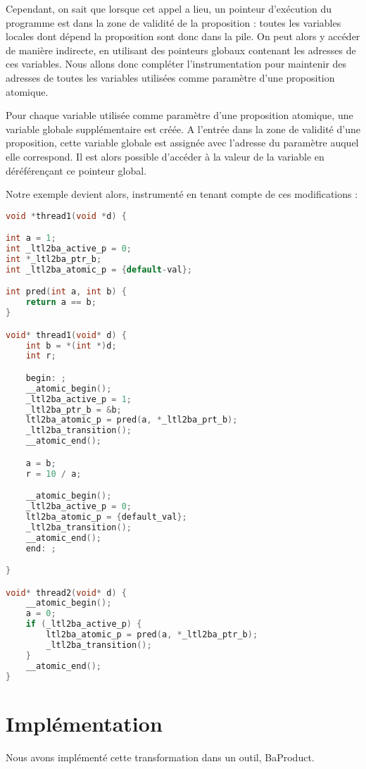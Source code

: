 Cependant, on sait que lorsque cet appel a lieu, un pointeur d'exécution
du programme est dans la zone de validité de la proposition : toutes les
variables locales dont dépend la proposition sont donc dans la pile. On
peut alors y accéder de manière indirecte, en utilisant des pointeurs
globaux contenant les adresses de ces variables. Nous allons donc
compléter l'instrumentation pour maintenir des adresses de toutes les
variables utilisées comme paramètre d'une proposition atomique.

Pour chaque variable utilisée comme paramètre d'une proposition
atomique, une variable globale supplémentaire est créée. A l'entrée dans
la zone de validité d'une proposition, cette variable globale est
assignée avec l'adresse du paramètre auquel elle correspond. Il est
alors possible d'accéder à la valeur de la variable en déréférençant ce
pointeur global.

Notre exemple devient alors, instrumenté en tenant compte de ces
modifications :

\begin{lstlisting}[language=C]
void *thread1(void *d) {

int a = 1;
int _ltl2ba_active_p = 0;
int *_ltl2ba_ptr_b;
int _ltl2ba_atomic_p = {default-val};

int pred(int a, int b) {
    return a == b;
}

void* thread1(void* d) {
    int b = *(int *)d;
    int r;

    begin: ;
    __atomic_begin();
    _ltl2ba_active_p = 1;
    _ltl2ba_ptr_b = &b;
    ltl2ba_atomic_p = pred(a, *_ltl2ba_prt_b);
    _ltl2ba_transition();
    __atomic_end();

    a = b;
    r = 10 / a;

    __atomic_begin();
    _ltl2ba_active_p = 0;
    ltl2ba_atomic_p = {default_val};
    _ltl2ba_transition();
    __atomic_end();
    end: ;

}

void* thread2(void* d) {
    __atomic_begin();
    a = 0;
    if (_ltl2ba_active_p) {
        ltl2ba_atomic_p = pred(a, *_ltl2ba_ptr_b);
        _ltl2ba_transition();
    }
    __atomic_end();
}
\end{lstlisting}

\section{Implémentation}

Nous avons implémenté cette transformation dans un outil, BaProduct.

